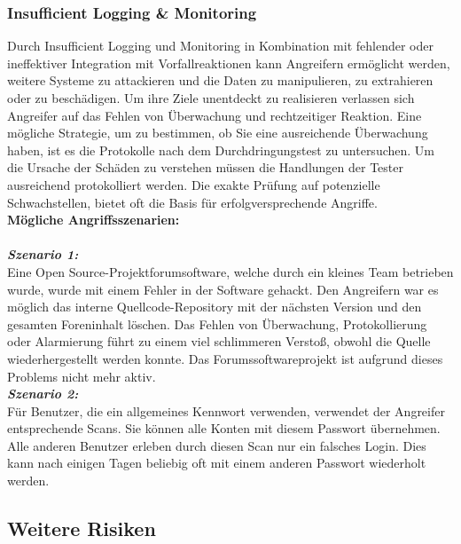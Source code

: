 \subsubsection{Insufficient Logging \& Monitoring}

Durch Insufficient Logging und Monitoring in Kombination mit fehlender oder ineffektiver Integration mit Vorfallreaktionen kann Angreifern ermöglicht werden, weitere Systeme zu attackieren und die Daten zu manipulieren, zu extrahieren oder zu beschädigen\cite[6]{owasp17top10}. Um ihre Ziele unentdeckt zu realisieren verlassen sich Angreifer auf das Fehlen von Überwachung und rechtzeitiger Reaktion. Eine mögliche Strategie, um zu bestimmen, ob Sie eine ausreichende Überwachung haben, ist es die Protokolle nach dem Durchdringungstest zu untersuchen. Um die Ursache der Schäden zu verstehen müssen die Handlungen der Tester ausreichend protokolliert werden. Die exakte Prüfung auf potenzielle Schwachstellen, bietet oft die Basis für erfolgversprechende Angriffe\cite[16]{owasp17top10}.\\

\textbf{Mögliche Angriffsszenarien:}\\
\\
\textbf{\textit{Szenario 1:}}\\

Eine Open Source-Projektforumsoftware, welche durch ein kleines Team betrieben wurde, wurde mit einem Fehler in der Software gehackt. Den Angreifern war es möglich das interne Quellcode-Repository mit der nächsten Version und den gesamten Foreninhalt löschen. Das Fehlen von Überwachung, Protokollierung oder Alarmierung führt zu einem viel schlimmeren Verstoß, obwohl die Quelle wiederhergestellt werden konnte. Das Forumssoftwareprojekt ist aufgrund dieses Problems nicht mehr aktiv\cite[16]{owasp17top10}.\\

\textbf{\textit{Szenario 2:}}\\

Für Benutzer, die ein allgemeines Kennwort verwenden, verwendet der Angreifer entsprechende Scans. Sie können alle Konten mit diesem Passwort übernehmen. Alle anderen Benutzer erleben durch diesen Scan nur ein falsches Login. Dies kann nach einigen Tagen beliebig oft mit einem anderen Passwort wiederholt werden\cite[16]{owasp17top10}.\\

\subsection{Weitere Risiken}

